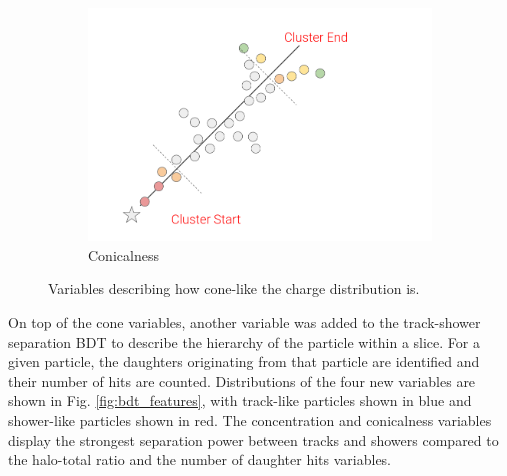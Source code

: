 \begin{figure}[hb!]
\begin{subfigure}[b]{0.495\textwidth}
            \includegraphics[width=\textwidth]{Conicalness}
            \caption{Conicalness}%
            \label{fig:conicalness}
        \end{subfigure}
        \caption[Cone-like Variable Diagrams]{
	Variables describing how cone-like the charge distribution is.
	}
        \label{fig:cone_variables}
\end{figure}


On top of the cone variables, another variable was added to the track-shower separation BDT to describe the hierarchy of the particle within a slice.
For a given particle, the daughters originating from that particle are identified and their number of hits are counted.
Distributions of the four new variables are shown in Fig. \ref{fig:bdt_features}, with track-like particles shown in blue and shower-like particles shown in red.
The concentration and conicalness variables display the strongest separation power between tracks and showers compared to the halo-total ratio and the number of daughter hits variables.

